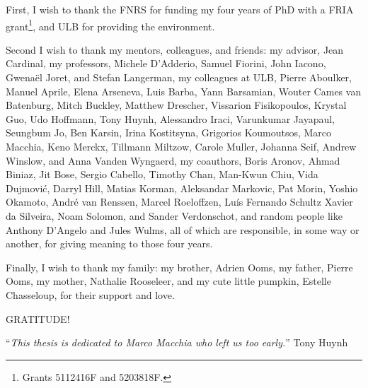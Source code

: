 
First, I wish to thank the FNRS for funding my four years of PhD with a FRIA
grant\footnote{%
Grants 5112416F and 5203818F.%
}, and ULB for providing the environment.

Second I wish to thank my mentors, colleagues, and friends:
%
my advisor,
Jean Cardinal,
%
my professors,
Michele D'Adderio,
Samuel Fiorini,
John Iacono,
Gwenaël Joret,
and
Stefan Langerman,
%
my colleagues at ULB,
Pierre Aboulker,
Manuel Aprile,
Elena Arseneva,
Luis Barba,
Yann Barsamian,
Wouter Cames van Batenburg,
Mitch Buckley,
Matthew Drescher,
Vissarion Fisikopoulos,
Krystal Guo,
Udo Hoffmann,
Tony Huynh,
Alessandro Iraci,
Varunkumar Jayapaul,
Seungbum Jo,
Ben Karsin,
Irina Kostitsyna,
Grigorios Koumoutsos,
Marco Macchia,
Keno Merckx,
Tillmann Miltzow,
Carole Muller,
Johanna Seif,
Andrew Winslow,
and
Anna Vanden Wyngaerd,
%
my coauthors,
Boris Aronov,
Ahmad Biniaz,
Jit Bose,
Sergio Cabello,
Timothy Chan,
Man-Kwun Chiu,
Vida Dujmovi\'c,
Darryl Hill,
Matias Korman,
Aleksandar Markovic,
Pat Morin,
Yoshio Okamoto,
André van Renssen,
Marcel Roeloffzen,
Luís Fernando Schultz Xavier da Silveira,
Noam Solomon,
and
Sander Verdonschot,
%
and
%
random people like
Anthony D'Angelo
and
Jules Wulms,
all of which are responsible, in some way or another, for giving meaning to
those four years.

Finally, I wish to thank my family:
my brother, Adrien Ooms,
my father, Pierre Ooms,
my mother, Nathalie Rooseleer,
%
and
%
my cute little pumpkin, Estelle Chasseloup,
for their support and love.

\vspace{\fill}
\centerline{\LARGE GRATITUDE!}
\vspace{\fill}
\centerline{``\emph{This thesis is dedicated to Marco Macchia who left us too
early.}'' Tony Huynh}
\vspace{\fill}
